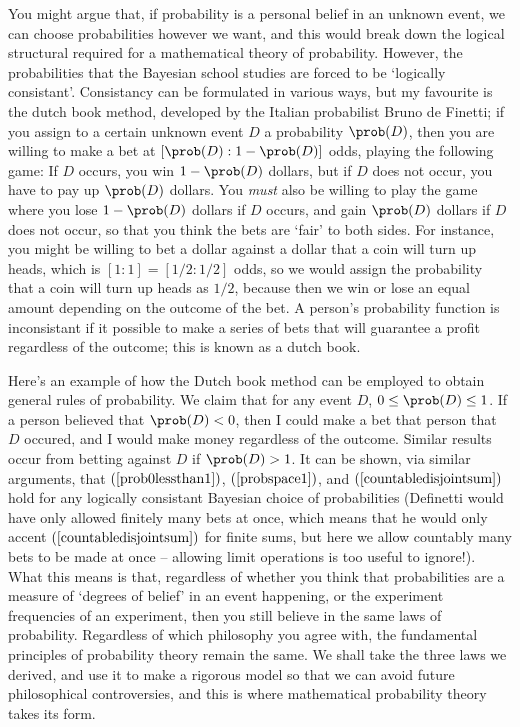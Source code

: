 You might argue that, if probability is a personal belief in an unknown event, we can choose probabilities however we want, and this would break down the logical structural required for a mathematical theory of probability. However, the probabilities that the Bayesian school studies are forced to be `logically consistant'. Consistancy can be formulated in various ways, but my favourite is the dutch book method, developed by the Italian probabilist Bruno de Finetti; if you assign to a certain unknown event $D$ a probability $\prob(D)$, then you are willing to make a bet at $[\prob(D):1 - \prob(D)]$ odds, playing the following game: If $D$ occurs, you win $1 - \prob(D)$ dollars, but if $D$ does not occur, you have to pay up $\prob(D)$ dollars. You {\it must} also be willing to play the game where you lose $1 - \prob(D)$ dollars if $D$ occurs, and gain $\prob(D)$ dollars if $D$ does not occur, so that you think the bets are `fair' to both sides. For instance, you might be willing to bet a dollar against a dollar that a coin will turn up heads, which is $[1:1] = [1/2:1/2]$ odds, so we would assign the probability that a coin will turn up heads as $1/2$, because then we win or lose an equal amount depending on the outcome of the bet. A person's probability function is inconsistant if it possible to make a series of bets that will guarantee a profit regardless of the outcome; this is known as a dutch book.

Here's an example of how the Dutch book method can be employed to obtain general rules of probability. We claim that for any event $D$, $0 \leq \prob(D) \leq 1$. If a person believed that $\prob(D) < 0$, then I could make a bet that person that $D$ occured, and I would make money regardless of the outcome. Similar results occur from betting against $D$ if $\prob(D) > 1$. It can be shown, via similar arguments, that $(\ref{prob0lessthan1})$, $(\ref{probspace1})$, and $(\ref{countabledisjointsum})$ hold for any logically consistant Bayesian choice of probabilities (Definetti would have only allowed finitely many bets at once, which means that he would only accent $(\ref{countabledisjointsum})$ for finite sums, but here we allow countably many bets to be made at once -- allowing limit operations is too useful to ignore!). What this means is that, regardless of whether you think that probabilities are a measure of `degrees of belief' in an event happening, or the experiment frequencies of an experiment, then you still believe in the same laws of probability. Regardless of which philosophy you agree with, the fundamental principles of probability theory remain the same. We shall take the three laws we derived, and use it to make a rigorous model so that we can avoid future philosophical controversies, and this is where mathematical probability theory takes its form.


